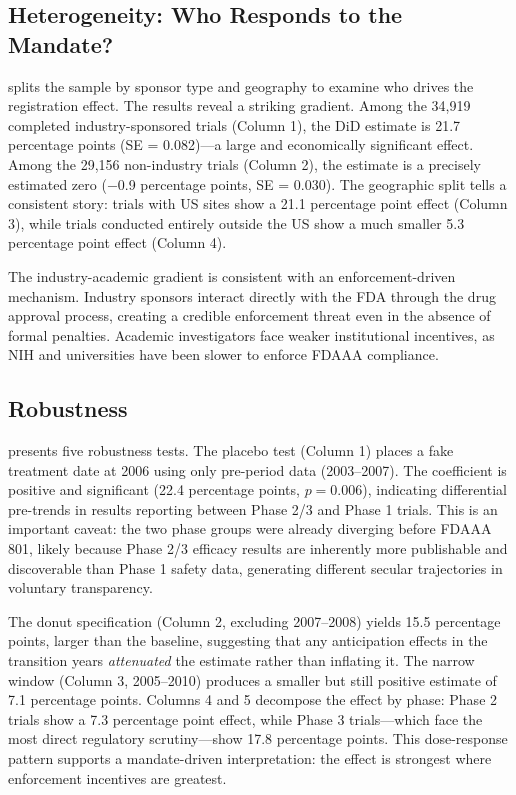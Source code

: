 \documentclass[12pt]{article}
\begin{document}
\subsection{Heterogeneity: Who Responds to the Mandate?}

 splits the sample by sponsor type and geography to examine who drives the registration effect. The results reveal a striking gradient. Among the 34,919 completed industry-sponsored trials (Column 1), the DiD estimate is 21.7 percentage points (SE = 0.082)---a large and economically significant effect. Among the 29,156 non-industry trials (Column 2), the estimate is a precisely estimated zero ($-$0.9 percentage points, SE = 0.030). The geographic split tells a consistent story: trials with US sites show a 21.1 percentage point effect (Column 3), while trials conducted entirely outside the US show a much smaller 5.3 percentage point effect (Column 4).



The industry-academic gradient is consistent with an enforcement-driven mechanism. Industry sponsors interact directly with the FDA through the drug approval process, creating a credible enforcement threat even in the absence of formal penalties. Academic investigators face weaker institutional incentives, as NIH and universities have been slower to enforce FDAAA compliance.

\subsection{Robustness}

 presents five robustness tests. The placebo test (Column 1) places a fake treatment date at 2006 using only pre-period data (2003--2007). The coefficient is positive and significant (22.4 percentage points, $p = 0.006$), indicating differential pre-trends in results reporting between Phase 2/3 and Phase 1 trials. This is an important caveat: the two phase groups were already diverging before FDAAA 801, likely because Phase 2/3 efficacy results are inherently more publishable and discoverable than Phase 1 safety data, generating different secular trajectories in voluntary transparency.

The donut specification (Column 2, excluding 2007--2008) yields 15.5 percentage points, larger than the baseline, suggesting that any anticipation effects in the transition years \textit{attenuated} the estimate rather than inflating it. The narrow window (Column 3, 2005--2010) produces a smaller but still positive estimate of 7.1 percentage points. Columns 4 and 5 decompose the effect by phase: Phase 2 trials show a 7.3 percentage point effect, while Phase 3 trials---which face the most direct regulatory scrutiny---show 17.8 percentage points. This dose-response pattern supports a mandate-driven interpretation: the effect is strongest where enforcement incentives are greatest.
\end{document}
